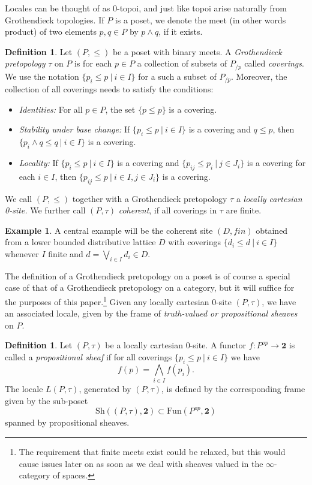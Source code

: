 \documentclass[10pt]{amsart}
\theoremstyle{definition}
\newtheorem{definition}[theorem]{Definition}
\newtheorem{example}[theorem]{Example}
\begin{document}
Locales can be thought of as $0$-topoi, and just like topoi arise naturally from Grothendieck topologies. If $P$ is a poset, we denote the meet (in other words product) of two elements $p,q \in P$ by $p \wedge q$, if it exists.

\begin{definition}
Let $(P,\leq)$ be a poset with binary meets. A \emph{Grothendieck pretopology} $\tau$ on $P$ is for each $p \in P$ a collection of subsets of $P_{/p}$ called \emph{coverings}. We use the notation $\{p_i \leq p ~|~i \in I\}$ for a such a subset of $P_{/p}$. Moreover, the collection of all coverings needs to satisfy the conditions:
\begin{itemize}
\item \emph{Identities:} For all $p \in P$, the set $\{ p \leq p \}$ is a covering.
\item \emph{Stability under base change:} If $\{p_i \leq p ~|~i \in I\}$ is a covering and $q \leq p$, then $\{p_i \wedge q \leq q ~|~i \in I\}$ is a covering.
\item \emph{Locality:} If $\{p_i \leq p ~|~i \in I\}$ is a covering and $\{p_{ij} \leq p_i ~|~j \in J_i\}$ is a covering for each $i \in I$, then $\{p_{ij} \leq p ~|~i \in I,j \in J_i\}$ is a covering.
\end{itemize}
We call $(P,\leq)$ together with a Grothendieck pretopology $\tau$ a \emph{locally cartesian 0-site.}
We further call $(P, \tau)$ \emph{coherent}, if all coverings in $\tau$ are finite.
\end{definition}

\begin{example}
A central example will be the coherent site $(D,fin)$ obtained from a lower bounded distributive lattice $D$ with coverings $\{d_i \leq d ~|~ i \in I\}$ whenever $I$ finite and $d = \bigvee_{i \in I} d_i \in D$.
\end{example}

The definition of a Grothendieck pretopology on a poset is of course a special case of that of a Grothendieck pretopology on a category, but it will suffice for the purposes of this paper.\footnote{The requirement that finite meets exist could be relaxed, but this would cause issues later on as soon as we deal with sheaves valued in the $\infty$-category of spaces.} Given any locally cartesian $0$-site $(P,\tau)$, we have an associated locale, given by the frame of \emph{truth-valued or propositional sheaves} on $P$.

\begin{definition} Let $(P,\tau)$ be a locally cartesian $0$-site. A functor $f: P^{op} \rightarrow \mathbf{2}$ is called a \emph{propositional sheaf} if for all coverings $\{p_i \leq p ~|~i \in I\}$ we have
$$f(p) = \bigwedge_{i \in I} f(p_i).$$
The locale $L(P,\tau)$, generated by $(P,\tau)$, is defined by the corresponding frame given by the sub-poset
$$\mathrm{Sh}((P,\tau), \mathbf{2}) \subset \mathrm{Fun}(P^{op}, \mathbf{2})$$
spanned by propositional sheaves.
\end{definition}
\end{document}
